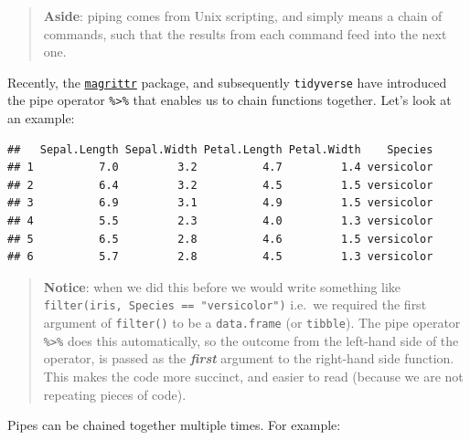 \documentclass[]{book}
\newenvironment{Shaded}{\begin{snugshade}}{\end{snugshade}}
\newcommand{\KeywordTok}[1]{\textcolor[rgb]{0.13,0.29,0.53}{\textbf{{#1}}}}
\newcommand{\DataTypeTok}[1]{\textcolor[rgb]{0.13,0.29,0.53}{{#1}}}
\newcommand{\DecValTok}[1]{\textcolor[rgb]{0.00,0.00,0.81}{{#1}}}
\newcommand{\StringTok}[1]{\textcolor[rgb]{0.31,0.60,0.02}{{#1}}}
\newcommand{\NormalTok}[1]{{#1}}
\theoremstyle{definition}
\theoremstyle{definition}
\theoremstyle{definition}
\theoremstyle{remark}
\begin{document}
\begin{quote}
\textbf{Aside}: piping comes from Unix scripting, and simply means a
chain of commands, such that the results from each command feed into the
next one.
\end{quote}

Recently, the
\href{https://cran.r-project.org/web/packages/magrittr/vignettes/magrittr.html}{\texttt{magrittr}}
package, and subsequently \texttt{tidyverse} have introduced the pipe
operator \texttt{\%\textgreater{}\%} that enables us to chain functions
together. Let's look at an example:

\begin{Shaded}
\end{Shaded}

\begin{verbatim}
##   Sepal.Length Sepal.Width Petal.Length Petal.Width    Species
## 1          7.0         3.2          4.7         1.4 versicolor
## 2          6.4         3.2          4.5         1.5 versicolor
## 3          6.9         3.1          4.9         1.5 versicolor
## 4          5.5         2.3          4.0         1.3 versicolor
## 5          6.5         2.8          4.6         1.5 versicolor
## 6          5.7         2.8          4.5         1.3 versicolor
\end{verbatim}

\begin{quote}
\textbf{Notice}: when we did this before we would write something like
\texttt{filter(iris,\ Species\ ==\ "versicolor")} i.e.~we required the
first argument of \texttt{filter()} to be a \texttt{data.frame} (or
\texttt{tibble}). The pipe operator \texttt{\%\textgreater{}\%} does
this automatically, so the outcome from the left-hand side of the
operator, is passed as the \textbf{\emph{first}} argument to the
right-hand side function. This makes the code more succinct, and easier
to read (because we are not repeating pieces of code).
\end{quote}

Pipes can be chained together multiple times. For example:

\begin{Shaded}
\end{Shaded}
\end{document}
